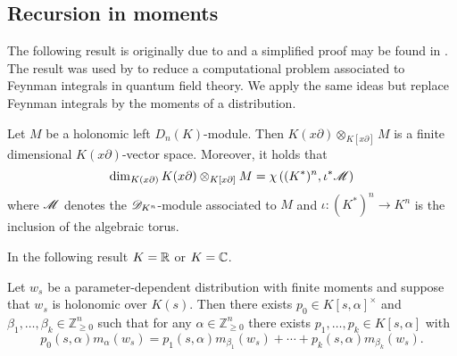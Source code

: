\subsection{Recursion in moments}
The following result is originally due to \cite[Theorem 1]{loeser1991caracterisation} and a simplified proof may be found in \cite[Appendix B]{bitoun2019feynman}.
The result was used by \cite{bitoun2019feynman} to reduce a computational problem associated to Feynman integrals in quantum field theory.
We apply the same ideas but replace Feynman integrals by the moments of a distribution.
\begin{theorem}\label{thm: HolonomicFiniteDimTorus}
  Let $M$ be a holonomic left $D_n(K)$-module.
  Then $K(x\partial)\otimes_{K[x\partial]}M$ is a finite dimensional $K(x\partial)$-vector space.
  Moreover, it holds that
  $$\dim_{K(x\partial)} K(x\partial)\otimes_{K[x\partial]}M  = \chi\left((K^*)^n , \iota^* \mathscr{M}\right)$$
  where $\mathscr{M}$ denotes the $\mathscr{D}_{K^n}$-module associated to $M$ and $\iota:(K^*)^n \to K^n$ is the inclusion of the algebraic torus.
\end{theorem}
In the following result $K=\mathbb{R}$ or $K = \mathbb{C}$.
\begin{corollary}\label{cor: Recursion}
  Let $w_s$ be a parameter-dependent distribution with finite moments and suppose that $w_s$ is holonomic over $K(s)$.
  Then there exists $p_0\in K[s,\alpha]^\times$ and $\beta_1,\ldots,\beta_k\in \mathbb{Z}_{\geq 0}^n$ such that for any $\alpha \in \mathbb{Z}_{\geq 0}^n$ there exists $p_1,\ldots,p_k \in K[s,\alpha]$ with
  $$p_0(s,\alpha) m_{\alpha}(w_s) = p_1(s,\alpha) m_{\beta_1}(w_s)+ \cdots + p_k(s,\alpha) m_{\beta_k}(w_s).$$
\end{corollary}
